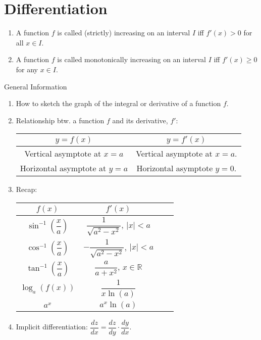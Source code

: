 \documentclass[oneside]{book}
\begin{document}
\chapter{Differentiation}
\begin{definition*}{}{}
  \begin{enumerate}
    \item A function \(f\) is called (strictly) increasing on an interval \(I\) iff \(f'(x)>0\) for all \(x \in I\).
    \item A function \(f\) is called monotonically increasing on an interval \(I\) iff \(f'(x) \geq 0\) for any \(x \in I\).
  \end{enumerate}
\end{definition*}
\begin{stbox}{General Information}
  \begin{enumerate}
    \item How to sketch the graph of the integral or derivative of a function \(f\).
    \item Relationship btw. a function \(f\) and its derivative, \(f'\):\\
    \begin{center}
      \begin{tabular}{|c|c|}
        \hline
        \(y=f(x)\) & \(y=f'(x)\)\\
        \hline
        Vertical asymptote at \(x=a\) & Vertical asymptote at \(x=a\).\\
        \hline
        Horizontal asymptote at \(y=a\) & Horizontal asymptote \(y=0\).\\
        \hline
      \end{tabular}
    \end{center}
    \item Recap:\\
    \begin{center}
      \begin{tabular}{|Sc|Sc|}
        \hline
        \(f(x)\) & \(f'(x)\)\\
        \hline
        \(\sin^{-1}\left(\dfrac{x}{a}\right)\) & \(\dfrac{1}{\sqrt{a^2-x^2}}\), \(\lvert x \rvert<a\)\\
        \hline
        \(\cos^{-1}\left(\dfrac{x}{a}\right)\) & \(-\dfrac{1}{\sqrt{a^2-x^2}}\), \(\lvert x \rvert<a\)\\
        \hline
        \(\tan^{-1}\left(\dfrac{x}{a}\right)\) & \(\dfrac{a}{a+x^2}\), \(x \in \mathbb{R}\)\\
        \hline
        \(\log_a(f(x))\) &  \(\dfrac{1}{x \ln(a)}\)\\
        \hline
        \(a^x\) & \(a^x \ln(a)\)\\
        \hline
      \end{tabular}
    \end{center}
    \item Implicit differentiation: \(\dfrac{dz}{dx}=\dfrac{dz}{dy}\cdot \dfrac{dy}{dx}\).
  \end{enumerate}
\end{stbox}
\end{document}
